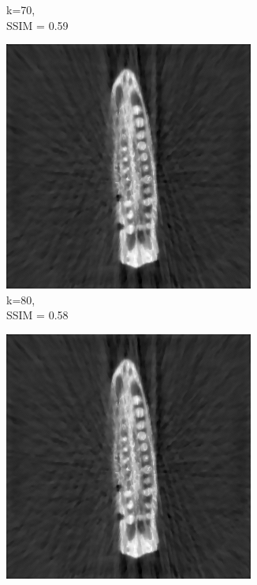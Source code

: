 \documentclass[journal]{IEEEtran}
\begin{document}
\begin{figure}[h]
\begin{subfigure}[b]{0.24\linewidth}
        \caption{k=70,\\ SSIM = 0.59}
     \end{subfigure}
  \begin{subfigure}[b]{0.24\linewidth}
        \includegraphics[width=\textwidth]{../images/okra/post_TCI/2D/48_views/tuning_k/weighted_prior_kk_80_lambda_prior_0.700000.png}
        \caption{k=80,\\ SSIM = 0.58}
     \end{subfigure}
   \begin{subfigure}[b]{0.24\linewidth}
        \includegraphics[width=\textwidth]{../images/okra/post_TCI/2D/48_views/tuning_k/weighted_prior_kk_90_lambda_prior_0.700000.png}

\end{subfigure}
\end{figure}
\end{document}
